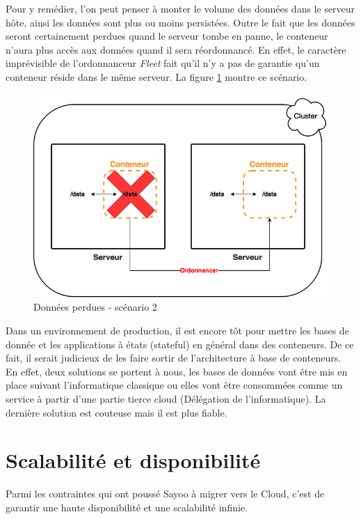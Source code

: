 \begin{onehalfspace}
Pour y remédier, l'on peut penser à monter le volume des données dans le serveur hôte, ainsi les données sont plus ou moins persistées. Outre le fait que les données seront certainement perdues quand le serveur tombe en panne, le conteneur n'aura plus accès aux données quand il sera réordonnancé. En effet, le caractère imprévisible de l'ordonnanceur \emph{Fleet} fait qu'il n'y a pas de garantie qu'un conteneur réside dans le même serveur. La figure \ref{fig:database2} montre ce scénario.

\begin{figure}[H]
\centering
\includegraphics [scale=0.5]{chapitre4/assets/database2}
\caption{Données perdues - scénario 2}
\label{fig:database2}
\end{figure}


Dans un environnement de production, il est encore tôt pour mettre les bases de donnée et les applications à états (stateful) en général dans des conteneurs. De ce fait, il serait judicieux de les faire sortir de l'architecture à base de conteneurs. En effet, deux solutions se portent à nous, les bases de données vont être mis en place suivant l'informatique classique ou elles vont être consommées comme un service à partir d'une partie tierce cloud (Délégation de l'informatique). La dernière solution est couteuse mais il est plus fiable.



\section{Scalabilité et disponibilité}


Parmi les contraintes qui ont poussé Sayoo à migrer vers le Cloud, c'est de garantir une haute disponibilité et une scalabilité infinie.


\end{onehalfspace}
